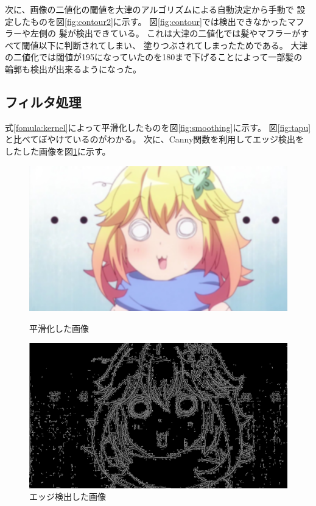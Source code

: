 \documentclass[dvipdfmx]{jsarticle}
\begin{document}
次に、画像の二値化の閾値を大津のアルゴリズムによる自動決定から手動で
設定したものを図\ref{fig:contour2}に示す。
図\ref{fig:contour}では検出できなかったマフラーや左側の
髪が検出できている。
これは大津の二値化では髪やマフラーがすべて閾値以下に判断されてしまい、
塗りつぶされてしまったためである。
大津の二値化では閾値が195になっていたのを180まで下げることによって一部髪の
輪郭も検出が出来るようになった。

\subsection{フィルタ処理}

式\ref{fomula:kernel}によって平滑化したものを図\ref{fig:smoothing}に示す。
図\ref{fig:tapu}と比べてぼやけているのがわかる。
次に、Canny関数を利用してエッジ検出をしたした画像を図\ref{fig:canny1}に示す。


\begin{figure}[htbp]
  \begin{minipage}{0.5\hsize}
    \centering
    \includegraphics[width=0.9\hsize]{../pic/smoothing.png}
    \caption{平滑化した画像}
    \label{fig:smoothing}
  \end{minipage}
  \begin{minipage}{0.5\hsize}
    \centering
    \includegraphics[width=0.9\hsize]{../pic/canny1.png}
    \caption{エッジ検出した画像}
    \label{fig:canny1}
  \end{minipage}
\end{figure}
\end{document}
